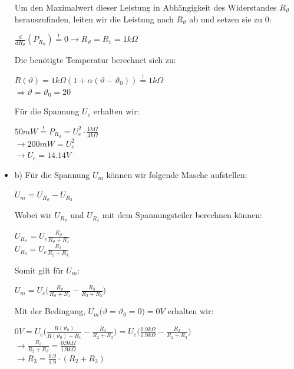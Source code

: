\begin{itemize}
  Um den Maximalwert dieser Leistung in Abhängigkeit des Widerstandes $R_\vartheta$ herauszufinden, leiten wir die Leistung nach $R_\vartheta$ ab und setzen sie zu 0:
  \begin{center}
    $\frac{d}{dR_\vartheta}(P_{R_\vartheta}) \stackrel{!}{=} 0 \rightarrow R_\vartheta = R_1 = 1k \Omega$
  \end{center}
  Die benötigte Temperatur berechnet sich zu:
  \begin{center}
    $R(\vartheta) = 1k\Omega (1 + \alpha (\vartheta - \vartheta_0)) \stackrel{!}{=} 1k \Omega$ \\
    $\Rightarrow \vartheta = \vartheta_0 = 20$\textdegree
  \end{center}
  Für die Spannung $U_e$ erhalten wir:
  \begin{center}
    $50mW \stackrel{!}{=} P_{R_\vartheta} = U_e^2 \cdot \frac{1k\Omega}{4k\Omega}$ \\
    $\rightarrow 200mW = U_e^2$ \\
    $ \rightarrow U_e = 14.14V$
  \end{center}
  \item b) Für die Spannung $U_m$ können wir folgende Masche aufstellen:
  \begin{center}
    $U_m = U_{R_\vartheta} - U_{R_3}$
  \end{center}
  Wobei wir $ U_{R_\vartheta}$ und $U_{R_3} $ mit dem Spannungsteiler berechnen können:
  \begin{center}
    $U_{R_\vartheta} = U_e \frac{R_\vartheta}{R_\vartheta + R_1} $ \\
      $U_{R_3} = U_e \frac{R_3}{R_2 + R_3} $
  \end{center}
  Somit gilt für $U_m$:
  \begin{center}
    $U_m = U_e \big(\frac{R_\vartheta}{R_\vartheta + R_1}  - \frac{R_3}{R_2 + R_3} \big)$
  \end{center}
  Mit der Bedingung, $U_m(\vartheta = \vartheta_0 = 0 $\textdegree$) = 0V$ erhalten wir:

  \begin{center}
      $0V= U_e \big(\frac{R(\vartheta_0 )}{R(\vartheta_0) + R_1}  - \frac{R_3}{R_2 + R_3} \big) = U_e \big(\frac{0.9 k\Omega}{1.9 k\Omega}  - \frac{R_3}{R_2 + R_3} \big)$ \\
      $\rightarrow \frac{R_3}{R_2 + R_3} = \frac{0.9 k\Omega}{1.9 k\Omega}  $ \\
      $\rightarrow R_3 = \frac{0.9}{1.9} \cdot (R_2 + R_3) $
  \end{center}


\end{itemize}
